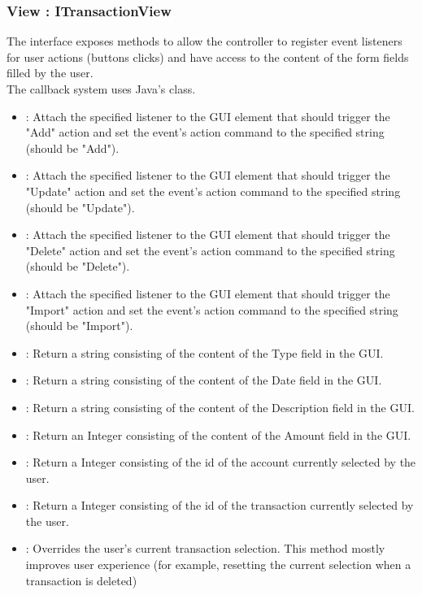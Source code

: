 \documentclass[12pt]{article}
\begin{document}
\subsubsection{View : ITransactionView}
The  interface exposes methods to allow the controller to register event listeners for user actions (buttons clicks) and have access to the content of the form fields filled by the user.\\
The callback system uses Java's  class.
\begin{itemize}
	\item {} : Attach the specified listener to the GUI element that should trigger the "Add" action and set the event's action command to the specified string (should be "Add").
	\item {} : Attach the specified listener to the GUI element that should trigger the "Update" action and set the event's action command to the specified string (should be "Update").
	\item {} : Attach the specified listener to the GUI element that should trigger the "Delete" action and set the event's action command to the specified string (should be "Delete").
		\item {} : Attach the specified listener to the GUI element that should trigger the "Import" action and set the event's action command to the specified string (should be "Import").
	\item {} : Return a string consisting of the content of the Type field in the GUI.
	\item {} : Return a string consisting of the content of the Date field in the GUI.
	\item {} : Return a string consisting of the content of the Description field in the GUI.
	\item {} : Return an Integer consisting of the content of the Amount field in the GUI.
	\item {} : Return a Integer consisting of the id of the account currently selected by the user.
	\item {} : Return a Integer consisting of the id of the transaction currently selected by the user.
	\item {} : Overrides the user's current transaction selection. This method mostly improves user experience (for example, resetting the current selection when a transaction is deleted)
\end{itemize}
\end{document}
